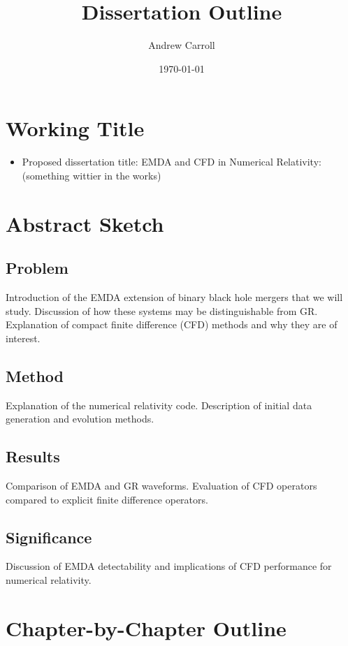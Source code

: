 \documentclass[12pt]{article}
\title{Dissertation Outline}
\author{Andrew Carroll}
\date{\today}
\begin{document}
\maketitle

\section{Working Title}
\begin{itemize}
    \item Proposed dissertation title: EMDA and CFD in Numerical Relativity: (something wittier in the works) 
\end{itemize}

\section{Abstract Sketch}

\subsection{Problem}
Introduction of the EMDA extension of binary black hole mergers that we will study. Discussion of how these systems may be distinguishable from GR. Explanation of compact finite difference (CFD) methods and why they are of interest.

\subsection{Method}
Explanation of the numerical relativity code. Description of initial data generation and evolution methods.

\subsection{Results}
Comparison of EMDA and GR waveforms. Evaluation of CFD operators compared to explicit finite difference operators.

\subsection{Significance}
Discussion of EMDA detectability and implications of CFD performance for numerical relativity.

\section{Chapter-by-Chapter Outline}
\end{document}
